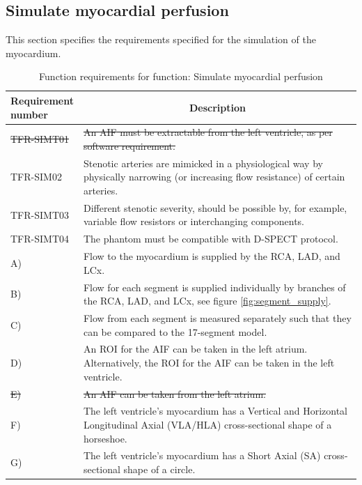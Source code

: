 \subsection{Simulate myocardial perfusion}
This section specifies the requirements specified for the simulation of the myocardium.
\begin{table} [H]
\caption{Function requirements for function: Simulate myocardial perfusion}
\label{tab:funcsim}
\begin{tabular}{l|p{120mm}|}
	\makecell[l]{\textbf{Requirement} \\  \textbf{number}} & \multicolumn{1}{c}{\textbf{Description}}\\
	\hline
	\sout{TFR-SIMT01} & \sout{An \ac{AIF} must be extractable from the left ventricle, as per software requirement.}\\
	TFR-SIM02 & Stenotic arteries are mimicked in a physiological way by physically narrowing (or increasing flow resistance) of certain arteries. \\
	TFR-SIMT03 & Different stenotic severity, should be possible by, for example, variable flow resistors or interchanging components. \\
	TFR-SIMT04 & The phantom must be compatible with D-SPECT protocol. \\
	\hspace{1.5cm} A) & Flow to the myocardium is supplied by the RCA, LAD, and LCx. \\
	\hspace{1.5cm} B) & Flow for each segment is supplied individually by branches of the RCA, LAD, and LCx, see figure \ref{fig:segment_supply}. \\
	\hspace{1.5cm} C) & Flow from each segment is measured separately such that they can be compared to the 17-segment model. \\
	\hspace{1.5cm} D) & An ROI for the AIF can be taken in the left atrium. Alternatively, the ROI for the AIF can be taken in the left ventricle. \\
	\hspace{1.5cm} \sout{E)} & \sout{An AIF can be taken from the left atrium.} \\
	\hspace{1.5cm} F) & The left ventricle's myocardium has a Vertical and Horizontal Longitudinal Axial (VLA/HLA) cross-sectional shape of a horseshoe. \\
	\hspace{1.5cm} G) & The left ventricle's myocardium has a Short Axial (SA) cross-sectional shape of a circle. \\

\end{tabular}
\end{table}
